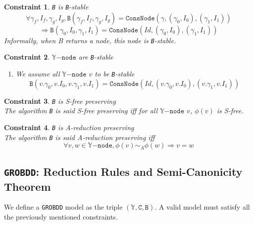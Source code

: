 \documentclass[a4paper,10pt]{article}
\newcommand{\Y}{\mathbb{Y}}
\newcommand{\Ynode}{\Y\mathtt{-node}}
\newcommand{\GroBdd}{\texttt{GROBDD}}
\newtheorem{newcons}{Constraint}
\newcommand{\constraint}[2]{\begin{newcons}{#1\\}#2\end{newcons}}
\begin{document}
\constraint{\texttt{B} is \texttt{B}-stable}
{\[\forall \gamma_f, I_f, \gamma_g, I_g, \mathtt{B}(\gamma_f, I_f, \gamma_g, I_g) = \mathtt{ConsNode}(\gamma, (\gamma_0, I_0), (\gamma_1, I_1))\]
\[\Rightarrow \mathtt{B}(\gamma_0, I_0, \gamma_1, I_1) = \mathtt{ConsNode}(Id, (\gamma_0, I_0), (\gamma_1, I_1))\]
Informally, when B returns a node, this node is \texttt{B}-stable.
}

\constraint{$\Ynode$ are \texttt{B}-stable}
{\begin{enumerate}
\item We assume all $\Ynode$ $v$ to be \texttt{B}-stable
\[\mathtt{B}(v.\gamma_0, v.I_0, v.\gamma_1, v.I_1) = \mathtt{ConsNode}(Id, (v.\gamma_0, v.I_0), (v.\gamma_1, v.I_1))\]
\end{enumerate}
}
\constraint{\texttt{B} is S-free preserving}
{The algorithm \texttt{B} is said S-free preserving iff for all $\Ynode$ $v$, $\phi(v)$ is S-free.}

\constraint{\texttt{B} is A-reduction preserving}
{The algorithm \texttt{B} is said A-reduction preserving iff
\[\forall v, w \in\Ynode, \phi(v) \sim_A \phi(w) \Rightarrow v = w\]}

\subsection{\GroBdd{}: Reduction Rules and Semi-Canonicity Theorem\label{grobdd-reduction}}
We define a \GroBdd{} model as the triple $(\Y, \mathtt{C}, \mathtt{B})$.
A valid model must satisfy all the previously mentioned constraints.
\end{document}

